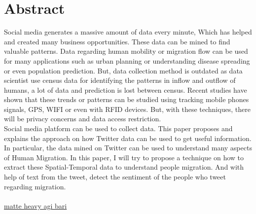 \chapter*{Abstract}
Social media generates a massive amount of data every minute, Which has helped and created
many business opportunities. These data can be mined to find valuable patterns. Data regarding
human mobility or migration flow can be used for many applications such as urban planning
or understanding disease spreading or even population prediction. But, data collection method
is outdated as data scientist use census data for identifying the patterns in inflow and outflow
of humans, a lot of data and prediction is lost between census. Recent studies have shown that
these trends or patterns can be studied using tracking mobile phones signals, GPS, WIFI or even
with RFID devices. But, with these techniques, there will be privacy concerns and data access
restriction. 
\\
Social media platform can be used to collect data. This paper proposes and explains the approach on how Twitter data can be used to get useful information. In particular, the data mined on Twitter can be used to understand many aspects of Human Migration. In this paper, I will try to propose a technique on how to extract these Spatial-Temporal data to understand people migration. And with help of text from the tweet, detect the sentiment of the people who tweet regarding migration.
\\
\\
\underline{matte heavy agi bari}